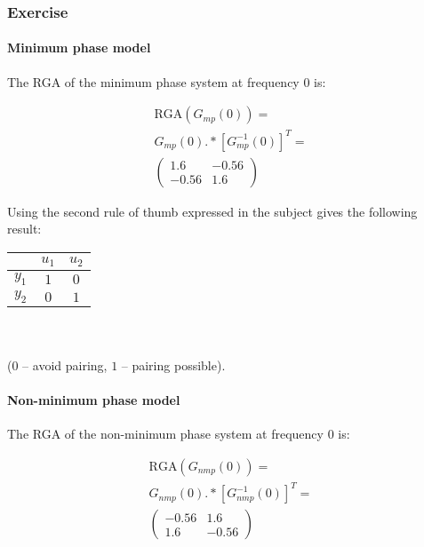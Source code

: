 \subsubsection{Exercise}
\paragraph{Minimum phase model}

The RGA of the minimum phase system at frequency $0$ is:

\begin{multline*} 
    \text{RGA}(G_{mp}(0)) = \\
    G_{mp}(0) .* [G_{mp}^{-1}(0)]^T = \\
    \left(\begin{array}{cc} 1.6 & -0.56\\ -0.56 & 1.6 \end{array}\right)
\end{multline*}

Using the second rule of thumb expressed in the subject gives the following result:

\begin{center}
\begin{tabular}{|c|cc|}
    \hline
    & $u_1$ & $u_2$ \\ 
    \hline
    $y_1$ & $1$ & $0$ \\
    $y_2$ & $0$ & $1$ \\
    \hline
\end{tabular} \ \\ \ \\
($0$ -- avoid pairing, $1$ -- pairing possible).
\end{center}

\paragraph{Non-minimum phase model}

The RGA of the non-minimum phase system at frequency $0$ is:

\begin{multline*}
    \text{RGA}(G_{nmp}(0)) = \\ 
    G_{nmp}(0) .* [G_{nmp}^{-1}(0)]^T =  \\
    \left(\begin{array}{cc} -0.56 & 1.6\\ 1.6 & -0.56 \end{array}\right)
\end{multline*}

